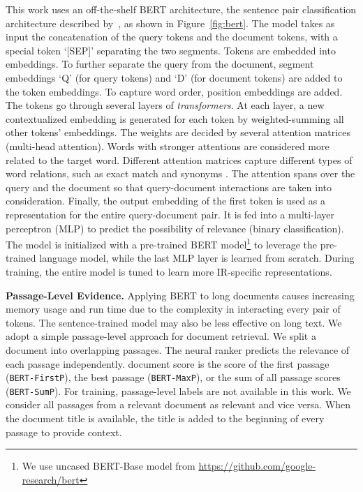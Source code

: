 \documentclass[sigconf]{acmart}
\begin{document}
This work uses an off-the-shelf BERT architecture, the sentence pair classification architecture described by~\citet{devlin2018bert}, as shown in Figure~\ref{fig:bert}. The model takes as input the concatenation of the query tokens and the document tokens, with a special token `[SEP]'  separating the two segments. Tokens are embedded into embeddings. To further separate the query from the document, segment embeddings `Q' (for query tokens) and `D' (for document tokens) are added to the token embeddings. To capture word order, position embeddings are added. The tokens go through several layers of \emph{transformers}. At each layer, a new contextualized embedding is generated for each token by weighted-summing all other tokens' embeddings. The weights are decided by several attention matrices (multi-head attention). Words with stronger attentions are considered more related to the target word. Different attention matrices capture different types of word relations, such as exact match and synonyms . The attention spans over the query and the document so that query-document interactions are taken into consideration. Finally, the output embedding of the first token is used as a representation for the entire query-document pair. It is fed into a multi-layer perceptron (MLP) to predict the possibility of relevance (binary classification).
The model is initialized with a pre-trained BERT model\footnote{We use uncased BERT-Base model from \url{https://github.com/google-research/bert}} to leverage the pre-trained language model, while the last MLP layer is learned from scratch. During training, the entire model is tuned to learn more IR-specific representations. 


\textbf{Passage-Level Evidence.} Applying BERT to long documents causes increasing memory usage and run time due to the complexity in interacting every pair of tokens. The sentence-trained model may also be less effective on long text. We adopt a simple passage-level approach for document retrieval. We split a document into overlapping passages. The neural ranker predicts the relevance of each passage independently.  document score is the score of the first passage (\texttt{BERT-FirstP}), the best passage (\texttt{BERT-MaxP}), or the sum of all passage scores (\texttt{BERT-SumP}). For training, passage-level labels are not available in this work. We consider all passages from a relevant document as relevant and vice versa. When the document title is available, the title is added to the beginning of every passage to provide context. 
\end{document}
